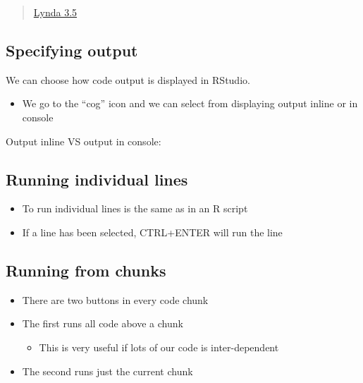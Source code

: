 \documentclass[]{article}
\providecommand{\tightlist}{%
  \setlength{\itemsep}{0pt}\setlength{\parskip}{0pt}}
\begin{document}
\begin{quote}
\href{https://www.lynda.com/RStudio-tutorials/Writing-running-R-code-R-Markdown-files/699348/2700134-4.html?srchtrk=index\%3a1\%0alinktypeid\%3a2\%0aq\%3ar+markdown\%0apage\%3a1\%0as\%3arelevance\%0asa\%3atrue\%0aproducttypeid\%3a2}{Lynda
3.5}
\end{quote}

\hypertarget{specifying-output}{%
\subsection{Specifying output}\label{specifying-output}}

We can choose how code output is displayed in RStudio.

\begin{itemize}
\tightlist
\item
  We go to the ``cog'' icon and we can select from displaying output
  inline or in console
\end{itemize}

Output inline VS output in console:

\hypertarget{running-individual-lines}{%
\subsection{Running individual lines}\label{running-individual-lines}}

\begin{itemize}
\tightlist
\item
  To run individual lines is the same as in an R script
\item
  If a line has been selected, CTRL+ENTER will run the line
\end{itemize}

\hypertarget{running-from-chunks}{%
\subsection{Running from chunks}\label{running-from-chunks}}

\begin{itemize}
\tightlist
\item
  There are two buttons in every code chunk
\item
  The first runs all code above a chunk

  \begin{itemize}
  \tightlist
  \item
    This is very useful if lots of our code is inter-dependent
  \end{itemize}
\item
  The second runs just the current chunk
\end{itemize}
\end{document}
